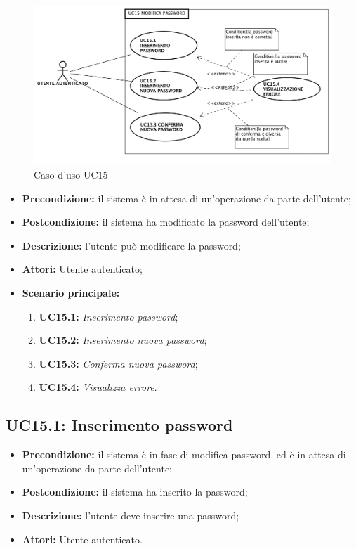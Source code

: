 \begin{figure}[h]
	\begin{center}
	\includegraphics[scale=0.4]{diagram/UC15.png}
	\caption{Caso d'uso UC15}
	\end{center}
\end{figure}
\begin{itemize}
	\item \textbf{Precondizione:} il sistema è in attesa di un'operazione da parte dell'utente;
	\item \textbf{Postcondizione:} il sistema ha modificato la password dell'utente;
	\item \textbf{Descrizione:} l'utente può modificare la password;
	\item \textbf{Attori:} Utente autenticato;
	\item \textbf{Scenario principale:}
	\begin{enumerate}
		\item \textbf{ UC15.1:} \textit{ Inserimento password};
		\item \textbf{ UC15.2:} \textit{ Inserimento nuova password};
		\item \textbf{ UC15.3:} \textit{ Conferma nuova password};
		\item \textbf{ UC15.4:} \textit{ Visualizza errore}.
	\end{enumerate}
\end{itemize}
\subsection{ UC15.1: Inserimento password}

\begin{itemize}
	\item \textbf{Precondizione:} il sistema è in fase di modifica password, ed è in attesa di un'operazione da parte dell'utente;
	\item \textbf{Postcondizione:} il sistema ha inserito la password;
	\item \textbf{Descrizione:} l'utente deve inserire una password;
	\item \textbf{Attori:} Utente autenticato.
\end{itemize}

